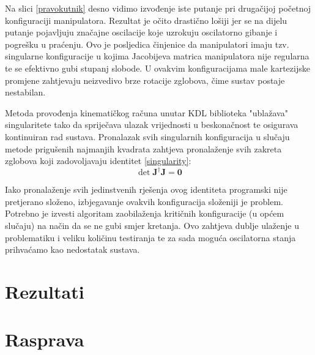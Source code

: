 \documentclass[times, utf8, diplomski, numeric]{fer}
\begin{document}

Na slici \ref{pravokutnik} desno vidimo izvođenje iste putanje pri drugačijoj početnoj konfiguraciji manipulatora.
Rezultat je očito drastično lošiji jer se na dijelu putanje pojavljuju značajne oscilacije koje uzrokuju oscilatorno gibanje i pogrešku u praćenju.
Ovo je posljedica činjenice da manipulatori imaju tzv. singularne konfiguracije u kojima Jacobijeva matrica manipulatora nije regularna te se efektivno gubi stupanj slobode.
U ovakvim konfiguracijama male kartezijske promjene zahtjevaju neizvedivo brze rotacije zglobova, čime sustav postaje nestabilan.

Metoda provođenja kinematičkog računa unutar KDL biblioteka "ublažava" singularitete tako da spriječava ulazak vrijednosti u beskonačnost te osigurava kontinuiran rad sustava.
Pronalazak svih singularnih konfiguracija u slučaju metode prigušenih najmanjih kvadrata zahtjeva pronalaženje svih zakreta zglobova koji zadovoljavaju identitet \ref{singularity}:
\begin{equation}
\det \mathbf{\mathbf{J}^{\dagger} \mathbf{J}} = \mathbf{0} \label{singularity}
\end{equation}

Iako pronalaženje svih jedinstvenih rješenja ovog identiteta programski nije pretjerano složeno, izbjegavanje ovakvih konfiguracija složeniji je problem.
Potrebno je izvesti algoritam zaobilaženja kritičnih konfiguracije (u općem slučaju) na način da se ne gubi smjer kretanja.
Ovo zahtjeva dublje ulaženje u problematiku i veliku količinu testiranja te za sada moguća oscilatorna stanja prihvaćamo kao nedostatak sustava.


\chapter{Rezultati}


\chapter{Rasprava}
\end{document}
